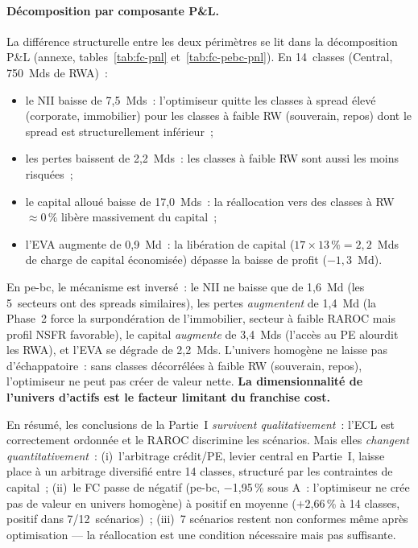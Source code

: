 \documentclass[10pt, a4paper, oneside]{report}
\theoremstyle{definition}
\begin{document}
\paragraph{Décomposition par composante P\&L.} La différence structurelle entre les deux périmètres se lit dans la décomposition P\&L (annexe, tables~\ref{tab:fc-pnl} et~\ref{tab:fc-pebc-pnl}). En 14~classes (Central, 750~Mds de RWA)~:
%
\begin{itemize}[nosep]
\item le NII baisse de 7{,}5~Mds~: l'optimiseur quitte les classes à spread élevé (corporate, immobilier) pour les classes à faible RW (souverain, repos) dont le spread est structurellement inférieur~;
\item les pertes baissent de 2{,}2~Mds~: les classes à faible RW sont aussi les moins risquées~;
\item le capital alloué baisse de 17{,}0~Mds~: la réallocation vers des classes à RW $\approx 0\,\%$ libère massivement du capital~;
\item l'EVA augmente de 0{,}9~Md~: la libération de capital ($17 \times 13\,\% = 2{,}2$~Mds de charge de capital économisée) dépasse la baisse de profit ($-1{,}3$~Md).
\end{itemize}
%
En pe-bc, le mécanisme est inversé~: le NII ne baisse que de 1{,}6~Md (les 5~secteurs ont des spreads similaires), les pertes \emph{augmentent} de 1{,}4~Md (la Phase~2 force la surpondération de l'immobilier, secteur à faible RAROC mais profil NSFR favorable), le capital \emph{augmente} de 3{,}4~Mds (l'accès au PE alourdit les RWA), et l'EVA se dégrade de 2{,}2~Mds. L'univers homogène ne laisse pas d'échappatoire~: sans classes décorrélées à faible RW (souverain, repos), l'optimiseur ne peut pas créer de valeur nette. \textbf{La dimensionnalité de l'univers d'actifs est le facteur limitant du franchise cost.}

\medskip
\noindent En résumé, les conclusions de la Partie~I \emph{survivent qualitativement}~: l'ECL est correctement ordonnée et le RAROC discrimine les scénarios. Mais elles \emph{changent quantitativement}~: (i)~l'arbitrage crédit/PE, levier central en Partie~I, laisse place à un arbitrage diversifié entre 14 classes, structuré par les contraintes de capital~; (ii)~le FC passe de négatif (pe-bc, $-$1{,}95\,\% sous A~: l'optimiseur ne crée pas de valeur en univers homogène) à positif en moyenne ($+$2{,}66\,\% à 14 classes, positif dans 7/12~scénarios)~; (iii)~7 scénarios restent non conformes même après optimisation --- la réallocation est une condition nécessaire mais pas suffisante.
\end{document}
